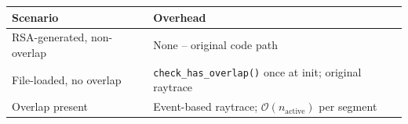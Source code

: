 \documentclass[english,a4paper]{my_memo}
\begin{document}
\begin{center}
\begin{tabular}{ll}
\hline
Scenario & Overhead \\
\hline
RSA-generated, non-overlap & None -- original code path \\
File-loaded, no overlap & \texttt{check\_has\_overlap()} once at init; original raytrace \\
Overlap present & Event-based raytrace; $\mathcal{O}(n_\mathrm{active})$ per segment \\
\hline
\end{tabular}
\end{center}
\end{document}
